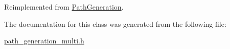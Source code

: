 Reimplemented from \hyperlink{classPathGeneration_afc14af2b771829ca2581463e4e4c1213}{Path\+Generation}.



The documentation for this class was generated from the following file\+:\begin{DoxyCompactItemize}
\item 
\hyperlink{path__generation__multi_8h}{path\+\_\+generation\+\_\+multi.\+h}\end{DoxyCompactItemize}
